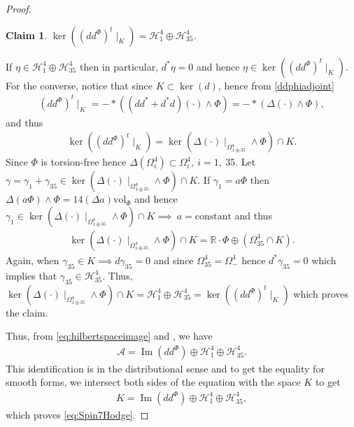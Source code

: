 \documentclass[10pt,a4paper]{amsart}
\newtheorem{claim}{Claim}
\DeclareMathOperator{\Ima}{Im}
\def\bR{\mathbb R}
\def\cA{\mathcal{A}}
\def\cH{\mathcal{H}}
\def\ddphi{dd^{\Phi}}
\newcommand{\vol}{\mathrm{vol}}
\begin{document}
\begin{proof}
\noindent
\begin{claim}\label{claim:Spin7Hodge}
$\ker \left((\ddphi)^t\mid_{K} \right) = \cH^4_1\oplus\cH^4_{35}$.
\end{claim}
If $\eta\in \cH^4_1\oplus\cH^4_{35}$ then in particular, $d^*\eta =0$ and hence $\eta\in \ker \left((\ddphi)^t\mid_{K} \right)$. For the converse, notice that since $K\subset \ker(d)$, hence from \cref{ddphiadjoint}
\begin{align*}
(\ddphi)^t\mid_K = -*((dd^*+d^*d)(\cdot)\wedge \Phi)=-*(\Delta(\cdot) \wedge \Phi),
\end{align*}
and thus
\begin{align*}
\ker \left((\ddphi)^t\mid_{K} \right)=\ker(\Delta(\cdot)\mid_{\Omega^4_{1\oplus 35}}\wedge \Phi)\cap K.
\end{align*}
Since $\Phi$ is torsion-free hence $\Delta(\Omega^4_{i})\subset \Omega^4_i,\ i=1,\ 35$. Let $\gamma=\gamma_1+\gamma_{35}\in \ker(\Delta(\cdot)\mid_{\Omega^4_{1\oplus 35}}\wedge \Phi)\cap K$. If $\gamma_1=a\Phi$ then $\Delta(a\Phi)\wedge \Phi=14(\Delta a)\vol_{\Phi}$ and hence $\gamma_1\in \ker(\Delta(\cdot)\mid_{\Omega^4_{1\oplus 35}}\wedge \Phi)\cap K \implies\ a=\text{constant}$ and thus
\begin{align*}
\ker(\Delta(\cdot)\mid_{\Omega^4_{1\oplus 35}}\wedge \Phi)\cap K = \bR\cdot \Phi \oplus \left(\Omega^4_{35}\cap K \right).
\end{align*}
Again, when $\gamma_{35}\in K \implies d\gamma_{35}=0$ and since $\Omega^4_{35}=\Omega^4_{-}$ hence $d^*\gamma_{35}=0$ which implies that $\gamma_{35}\in \cH^4_{35}$. Thus, $\ker(\Delta(\cdot)\mid_{\Omega^4_{1\oplus 35}}\wedge \Phi)\cap K=\cH^4_1\oplus \cH^4_{35}=\ker((\ddphi)^t\mid_K)$ which proves the claim.

\medskip

Thus, from \cref{eq:hilbertspaceimage} and , we have
\begin{align*}
\cA = \Ima(\ddphi) \oplus \cH^4_1\oplus \cH^4_{35}.
\end{align*}
This identification is in the distributional sense and to get the equality for smooth forms, we intersect both sides of the equation with the space $K$ to get
\begin{align*}
K=\Ima(\ddphi) \oplus \cH^4_1\oplus \cH^4_{35},
\end{align*}
which proves \cref{eq:Spin7Hodge}.
\end{proof}
\end{document}

